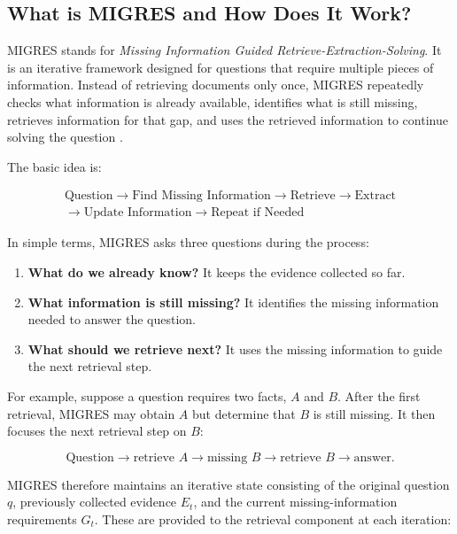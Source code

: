 \documentclass[11pt,a4paper]{article}
\begin{document}
\subsection{What is MIGRES and How Does It Work?}

MIGRES stands for \textit{Missing Information Guided Retrieve-Extraction-Solving}. It is an iterative framework designed for questions that require multiple pieces of information. Instead of retrieving documents only once, MIGRES repeatedly checks what information is already available, identifies what is still missing, retrieves information for that gap, and uses the retrieved information to continue solving the question \citep{wang-etal-2025-llms}.

The basic idea is:

\[
\boxed{
\begin{array}{c}
\text{Question}
\rightarrow
\text{Find Missing Information}
\rightarrow
\text{Retrieve}
\rightarrow
\text{Extract}
\\
\rightarrow
\text{Update Information}
\rightarrow
\text{Repeat if Needed}
\end{array}
}
\]

In simple terms, MIGRES asks three questions during the process:

\begin{enumerate}[leftmargin=1.5em]
    \item \textbf{What do we already know?}
    It keeps the evidence collected so far.

    \item \textbf{What information is still missing?}
    It identifies the missing information needed to answer the question.

    \item \textbf{What should we retrieve next?}
    It uses the missing information to guide the next retrieval step.
\end{enumerate}

For example, suppose a question requires two facts, $A$ and $B$. After the first retrieval, MIGRES may obtain $A$ but determine that $B$ is still missing. It then focuses the next retrieval step on $B$:

\[
\text{Question}
\rightarrow
\text{retrieve }A
\rightarrow
\text{missing }B
\rightarrow
\text{retrieve }B
\rightarrow
\text{answer}.
\]

MIGRES therefore maintains an iterative state consisting of the original question $q$, previously collected evidence $E_t$, and the current missing-information requirements $G_t$. These are provided to the retrieval component at each iteration:
\end{document}
